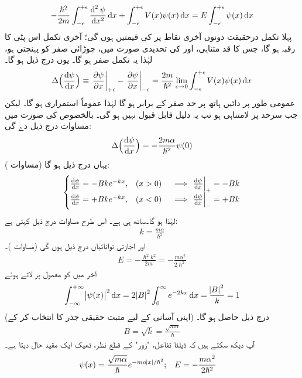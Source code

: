 \begin{align}
-\frac{\hslash^2}{2m}\int_{-\epsilon}^{+\epsilon}\frac{\dif^{\,2}\psi}{\dif x^2}\dif x+\int_{-\epsilon}^{+\epsilon}V(x)\psi(x)\dif x=E\int_{-\epsilon}^{+\epsilon}\psi(x)\dif x
\end{align}
پہلا تکمل درحقیقت  دونوں آخری نقاط پر  کی قیمتیں ہوں گی؛ آخری تکمل اس پٹی کا رقبہ ہو گا، جس کا قد متناہی، اور  کی تحدیدی صورت میں، چوڑائی صفر کو پہنچتی ہو، لہٰذا یہ تکمل صفر ہو گا۔ یوں درج ذیل ہو گا۔
\begin{align}
\Delta\Big(\frac{\dif\psi}{\dif x}\Big)\equiv \left.\frac{\partial \psi}{\partial x}\right|_{+\epsilon}-\left.\frac{\partial \psi}{\partial x}\right|_{-\epsilon}=\frac{2m}{\hslash^2}\lim_{\epsilon\to0}\int_{-\epsilon}^{+\epsilon}V(x)\psi(x)\dif x
\end{align}
 عمومی طور پر دائیں ہاتھ پر حد صفر کے برابر ہو گا لہٰذا  عموماً استمراری ہو گا۔ لیکن جب سرحد پر  لامتناہی ہو تب یہ دلیل قابل قبول نہیں ہو گی۔ بالخصوص  کی صورت میں مساوات   درج ذیل دے گی: 
\begin{align}\label{مساوات_شروڈنگر_مبدا_پر_تفرقات_کا_فرق}
\Delta\Big(\frac{\dif \psi}{\dif x}\Big)=-\frac{2m\alpha}{\hslash^2}\psi(0)
\end{align}
یہاں درج ذیل ہو گا (مساوات ):
\begin{align*}
\begin{cases}
\frac{\dif \psi}{\dif x}=-Bke^{-kx},&(x>0)\quad \implies \left.\frac{\dif\psi}{\dif x}\right|_{+}=-Bk\\
\frac{\dif \psi}{\dif x}=+Bke^{+kx},&(x<0)\quad \implies \left.\frac{\dif\psi}{\dif x}\right|_{-}=+Bk
\end{cases}
\end{align*}
لہٰذا  ہو گا۔ساتھ ہی  ہے۔ اس طرح مساوات   درج ذیل کہتی ہے:
\begin{align}
k=\frac{m\alpha}{\hslash^2 }
\end{align}
اور اجازتی توانائیاں درج ذیل ہوں گی (مساوات )۔
\begin{align}
E=-\frac{\hslash^2 k^2}{2m}=-\frac{m\alpha^2}{2\hslash^2}
\end{align}
 آخر میں  کو معمول پر لاتے ہوئے 
\begin{align*}
\int_{-\infty}^{+\infty}\abs{\psi(x)}^2\dif x=2\abs{B}^2\int_0^{\infty}e^{-2kx}\dif x=\frac{\abs{B}^2}{k}=1
\end{align*}
 (اپنی آسانی کے لیے مثبت حقیقی جذر کا انتخاب کر کے) درج ذیل حاصل ہو گا۔
\begin{align}
B=\sqrt{k}=\frac{\sqrt{m\alpha}}{\hslash}
\end{align}
آپ دیکھ سکتے ہیں کہ ڈیلٹا تفاعل، "زور"  کے قطع نظر،  ٹھیک ایک مقید حال دیتا ہے۔ 
\begin{align}
\psi(x)&=\frac{\sqrt{m\alpha}}{\hslash}e^{-m\alpha\abs{x}/\hslash^2};&&E=-\frac{m\alpha^2}{2\hslash^2}
\end{align}

